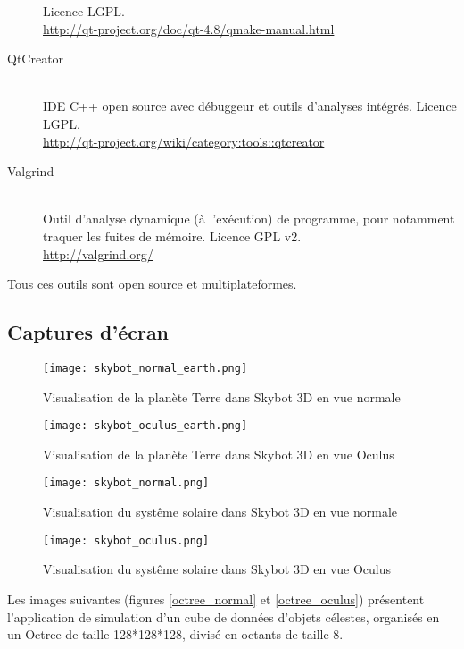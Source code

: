 \documentclass[a4paper,french,12pt]{article}
\begin{document}
\begin{description}
		    Licence LGPL.\\
		    \url{http://qt-project.org/doc/qt-4.8/qmake-manual.html}
		    \item [QtCreator]~\\
		      IDE C++ open source avec débuggeur et outils d'analyses intégrés.
		      Licence LGPL.\\
		      \url{http://qt-project.org/wiki/category:tools::qtcreator}
		  \item [Valgrind]~\\
		      Outil d'analyse dynamique (à l'exécution) de programme, pour notamment traquer les fuites de mémoire.
		      Licence GPL v2.\\
		      \url{http://valgrind.org/}
		  \end{description}

		Tous ces outils sont open source et multiplateformes.

	\subsection{Captures d'écran}
		\FloatBarrier
		\newpage
		\begin{figure}
			      \centering
			      \texttt{[image: skybot\_normal\_earth.png]}
			      \caption{Visualisation de la planète Terre dans Skybot 3D en vue normale}
		\end{figure}

		\begin{figure}
			      \centering
			      \texttt{[image: skybot\_oculus\_earth.png]}
			      \caption{Visualisation de la planète Terre dans Skybot 3D en vue Oculus}
		\end{figure}

		\begin{figure}
			      \centering
			      \texttt{[image: skybot\_normal.png]}
			      \caption{Visualisation du systême solaire dans Skybot 3D en vue normale}
		\end{figure}

		\begin{figure}
			      \centering
			      \texttt{[image: skybot\_oculus.png]}
			      \caption{Visualisation du systême solaire dans Skybot 3D en vue Oculus}
		\end{figure}

		\FloatBarrier
		Les images suivantes (figures \ref{octree_normal} et \ref{octree_oculus}) présentent l'application de simulation d'un cube de données d'objets célestes,
		organisés en un Octree  de taille 128*128*128, divisé en octants de taille 8.
\end{document}
